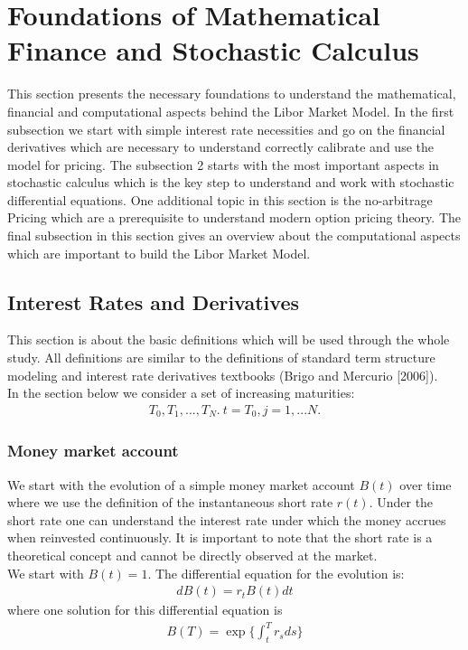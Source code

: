 \documentclass[11pt]{article}
\numberwithin{equation}{subsection}
\begin{document}
\section{Foundations of Mathematical Finance and Stochastic Calculus}
This section presents the necessary foundations to understand the mathematical, financial and computational aspects behind the Libor Market Model. In the first subsection we start with simple interest rate necessities and go on the financial derivatives which are necessary to understand correctly calibrate and use the model for pricing. The subsection 2 starts with the most important aspects in stochastic calculus which is the key step to understand and work with stochastic differential equations. One additional topic in this section is the no-arbitrage Pricing which are a prerequisite to understand modern option pricing theory. The final subsection in this section gives an overview about the computational aspects which are important to build the Libor Market Model.
\subsection{Interest Rates and Derivatives}
This section is about the basic definitions which will be used through the whole study. All definitions are similar to the definitions of standard term structure modeling and interest rate derivatives textbooks (Brigo and Mercurio [2006]).\\
In the section below we consider a set of increasing maturities:
\begin{eqnarray*}
T_0, T_1,...,T_N. \  t=T_0, j=1,...N.
\end{eqnarray*}
\subsubsection{Money market account}
We start with the evolution of a simple money market account \(B(t)\) over time where we use the definition of the instantaneous short rate \(r(t)\). Under the short rate one can understand the interest rate under which the money accrues when reinvested continuously. It is important to note that the short rate is a theoretical concept and cannot be directly observed at the market.\\	
We start with \(B(t)=1\). The differential equation for the evolution is:
\begin{eqnarray*}
	dB(t) = r_{t}B(t)dt
\end{eqnarray*}	
where one solution for this differential equation is
\begin{eqnarray}
B(T) = \exp\bigg\{\int_{t}^{T}r_s ds\bigg\}
\end{eqnarray}
%	
\end{document}

